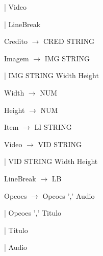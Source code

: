 \documentclass[11pt,a4paper]{report}
\begin{document}
\vspace{0.2cm}
\hspace{2.2cm} | Video

\vspace{0.2cm}
\hspace{2.2cm} | LineBreak

\vspace{0.2cm}
\hspace{1.0cm} Credito $\rightarrow$ CRED STRING

\vspace{0.2cm}
\hspace{1.0cm} Imagem $\rightarrow$ IMG STRING

\vspace{0.2cm}
\hspace{2.65cm} | IMG STRING Width Height

\vspace{0.2cm}
\hspace{1.0cm} Width $\rightarrow$ NUM

\vspace{0.2cm}
\hspace{1.0cm} Height $\rightarrow$ NUM

\vspace{0.2cm}
\hspace{1.0cm} Item $\rightarrow$ LI STRING

\vspace{0.2cm}
\hspace{1.0cm} Video $\rightarrow$ VID STRING

\vspace{0.2cm}
\hspace{2.3cm} | VID STRING Width Height

\vspace{0.2cm}
\hspace{1.0cm} LineBreak $\rightarrow$ LB

\vspace{0.2cm}
\hspace{1.0cm} Opcoes $\rightarrow$ Opcoes ',' Audio

\vspace{0.2cm}
\hspace{2.6cm} | Opcoes ',' Titulo

\vspace{0.2cm}
\hspace{2.6cm} | Titulo

\vspace{0.2cm}
\hspace{2.6cm} | Audio
\end{document}
